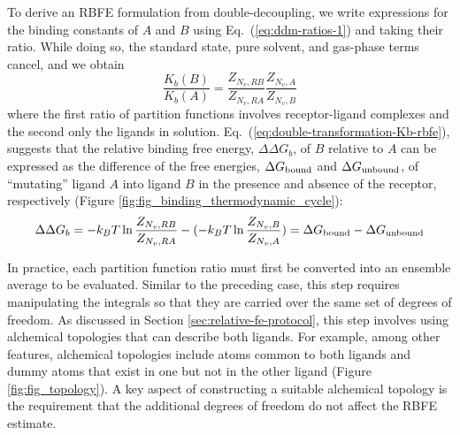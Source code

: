 \documentclass[9pt,bestpractices]{livecoms}
\begin{document}
To derive an RBFE formulation from double-decoupling, we write expressions for the binding constants of $A$ and $B$ using Eq.~(\ref{eq:ddm-ratios-1}) and taking their ratio. While doing so, the standard state, pure solvent, and gas-phase terms cancel, and we obtain
\begin{equation}\label{eq:double-transformation-Kb-rbfe}
\frac{K_b(B)}{K_b(A)} = \frac{Z_{N_v,RB}}{Z_{N_v,RA}} \frac{Z_{N_v,A}}{Z_{N_v,B}}
\end{equation}
where the first ratio of partition functions involves receptor-ligand complexes and the second only the ligands in solution. Eq.~(\ref{eq:double-transformation-Kb-rbfe}), suggests that the relative binding free energy, $\Delta \Delta G_b$, of $B$ relative to $A$ can be expressed as the difference of the free energies, $\Delta G_{\rm bound}$ and $\Delta G_{\rm unbound}$, of ``mutating'' ligand $A$ into ligand $B$ in the presence and absence of the receptor, respectively (Figure \ref{fig:fig_binding_thermodynamic_cycle}):~\cite{tembre1984ligandreceptor,gilson1997statisticalthermodynamic,mobley2012perspective,cournia2017relative,jiang2019computing, Lee_JChemTheoryComput_2020_v16_p5512}
\begin{equation}\label{eq:double-transformation-dg-rbfe}
\Delta \Delta G_b = -k_B T \ln \frac{Z_{N_v,RB}}{Z_{N_v,RA}} - (-k_B T \ln \frac{Z_{N_v,B}}{Z_{N_v,A}}) = \Delta G_{\rm bound} - \Delta G_{\rm unbound}
\end{equation}

In practice, each partition function ratio must first be converted into an ensemble average to be evaluated. Similar to the preceding case, this step requires manipulating the integrals so that they are carried over the same set of degrees of freedom. As discussed in Section \ref{sec:relative-fe-protocol}, this step involves using alchemical topologies that can describe both ligands. For example, among other features, alchemical topologies include atoms common to both ligands and dummy atoms that exist in one but not in the other ligand (Figure \ref{fig:fig_topology}). A key aspect of constructing a suitable alchemical topology is the requirement that the additional degrees of freedom do not affect the RBFE estimate.
\end{document}
